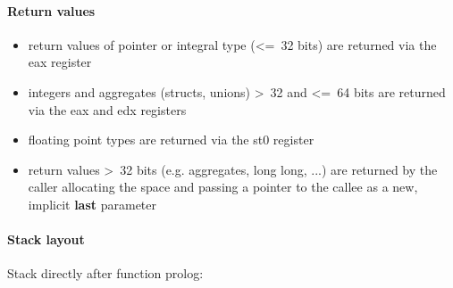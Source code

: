 \paragraph{Return values}

\begin{itemize}
\item return values of pointer or integral type (\textless=\ 32 bits) are returned via the eax register
\item integers and aggregates (structs, unions) \textgreater\ 32 and \textless=\ 64 bits are returned via the eax and edx registers
\item floating point types are returned via the st0 register
\item return values \textgreater\ 32 bits (e.g. aggregates, long long, ...) are returned by the caller allocating the space and
passing a pointer to the callee as a new, implicit {\bf last} parameter
\end{itemize}



\paragraph{Stack layout}

Stack directly after function prolog:\\

